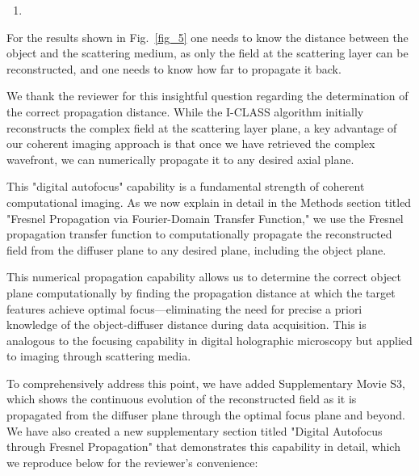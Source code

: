 \documentclass[12pt]{article}
\newenvironment{solved_reviewercomment}
    {\begin{tcolorbox}[width=\linewidth,colback=gray!5,colframe=solved_commentcolor!50,title=Reviewer Comment,left=5pt,right=5pt]}
    {\end{tcolorbox}}
\newenvironment{ourresponse}
    {\begin{tcolorbox}[width=\linewidth,breakable,enhanced,colback=gray!5,colframe=responsecolor!50,title=Response,left=5pt,right=5pt]}
    {\end{tcolorbox}}
\begin{document}
        
\begin{enumerate}[label=\arabic*., resume]
\item \leavevmode
\end{enumerate}
\vspace{-1em}
\begin{solved_reviewercomment}
    For the results shown in Fig.~\ref{fig_5} one needs to know the distance between the object and the scattering medium, as only the field at the scattering layer can be reconstructed, and one needs to know how far to propagate it back.
\end{solved_reviewercomment}

\begin{ourresponse}
    We thank the reviewer for this insightful question regarding the determination of the correct propagation distance. While the I-CLASS algorithm initially reconstructs the complex field at the scattering layer plane, a key advantage of our coherent imaging approach is that once we have retrieved the complex wavefront, we can numerically propagate it to any desired axial plane.
    
    This "digital autofocus" capability is a fundamental strength of coherent computational imaging. As we now explain in detail in the Methods section titled "Fresnel Propagation via Fourier-Domain Transfer Function," we use the Fresnel propagation transfer function to computationally propagate the reconstructed field from the diffuser plane to any desired plane, including the object plane.
    
    This numerical propagation capability allows us to determine the correct object plane computationally by finding the propagation distance at which the target features achieve optimal focus—eliminating the need for precise a priori knowledge of the object-diffuser distance during data acquisition. This is analogous to the focusing capability in digital holographic microscopy but applied to imaging through scattering media.
    
    To comprehensively address this point, we have added Supplementary Movie S3, which shows the continuous evolution of the reconstructed field as it is propagated from the diffuser plane through the optimal focus plane and beyond. We have also created a new supplementary section titled "Digital Autofocus through Fresnel Propagation" that demonstrates this capability in detail, which we reproduce below for the reviewer's convenience:

    \begin{quote}

\end{quote}
\end{ourresponse}
\end{document}
